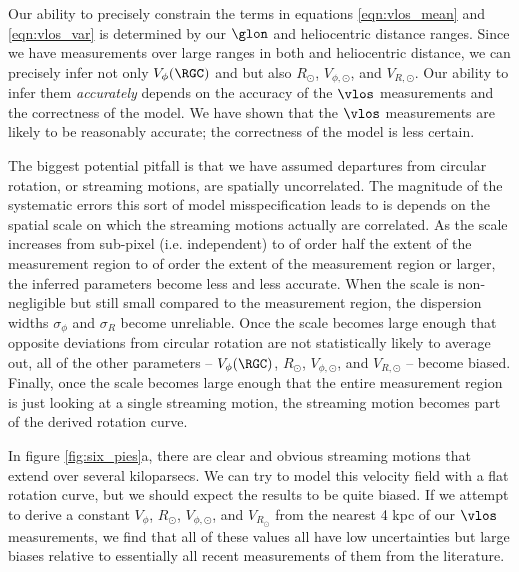 Our ability to precisely constrain the terms in equations \ref{eqn:vlos_mean} and \ref{eqn:vlos_var} is determined by our $\glon$ and heliocentric distance ranges. 
Since we have measurements over large ranges in both \glon and heliocentric distance, we can precisely infer not only $V_\phi(\RGC)$ and but also $R_\odot$, $V_{\phi, \odot}$, and $V_{R, \odot}$. 
Our ability to infer them \emph{accurately} depends on the accuracy of the $\vlos$ measurements and the correctness of the model.
We have shown that the $\vlos$ measurements are likely to be reasonably accurate; the correctness of the model is less certain.

The biggest potential pitfall is that we have assumed departures from circular rotation, or streaming motions, are spatially uncorrelated.
The magnitude of the systematic errors this sort of model misspecification leads to is depends on the spatial scale on which the streaming motions actually are correlated.
As the scale increases from sub-pixel (i.e. independent) to of order half the extent of the measurement region to of order the extent of the measurement region or larger, the inferred parameters become less and less accurate. 
When the scale is non-negligible but still small compared to the measurement region, the dispersion widths $\sigma_\phi$ and $\sigma_R$ become unreliable.
Once the scale becomes large enough that opposite deviations from circular rotation are not statistically likely to average out, all of the other parameters -- $V_\phi(\RGC)$, $R_\odot$, $V_{\phi, \odot}$, and $V_{R, \odot}$ -- become biased.
Finally, once the scale becomes large enough that the entire measurement region is just looking at a single streaming motion, the streaming motion becomes part of the derived rotation curve.

In figure \ref{fig:six_pies}a, there are clear and obvious streaming motions that extend over several kiloparsecs. 
We can try to model this velocity field with a flat rotation curve, but we should expect the results to be quite biased.
If we attempt to derive a constant $V_\phi$, $R_\odot$, $V_{\phi, \odot}$, and $V_{R_\odot}$ from the  nearest 4 kpc of our $\vlos$ measurements, we find that all of these values all have low uncertainties but large biases relative to essentially all recent measurements of them from the literature.



